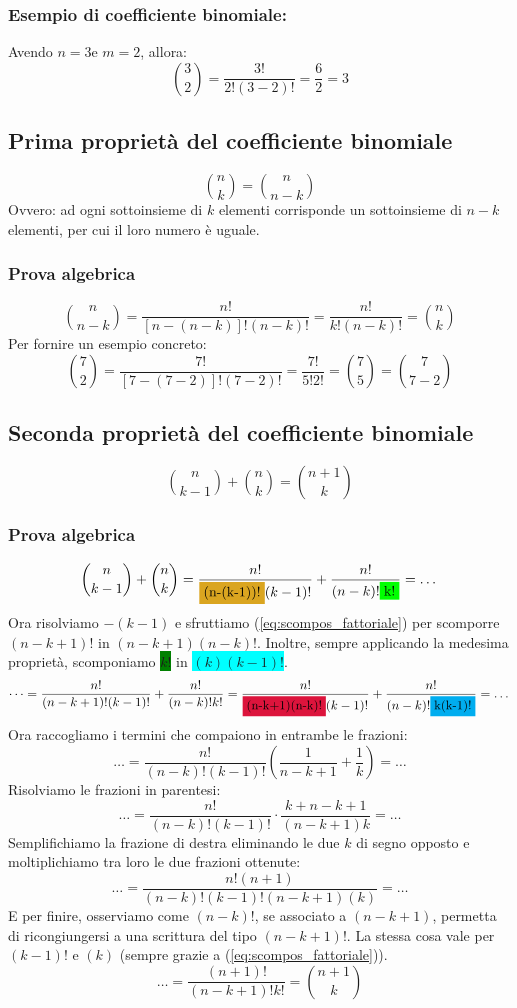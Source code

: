 \documentclass[12pt]{article}
\begin{document}
\subsubsection{Esempio di coefficiente binomiale:}
Avendo $n=3 \text{e } m=2$, allora:
\[
    \binom{3}{2} = \dfrac{3!}{2!(3-2)!} = \dfrac{6}{2} = 3
\]
\subsection{Prima proprietà del coefficiente binomiale}
\begin{equation}
    \binom{n}{k} = \binom{n}{n-k} \label{prop1_coeff_binomiale}
\end{equation}
Ovvero: ad ogni sottoinsieme di $k$ elementi corrisponde un sottoinsieme di $n-k$ elementi, per cui il loro numero è uguale.
\subsubsection{Prova algebrica}
\[
    \binom{n}{n-k} = \dfrac{n!}{[n-(n-k)]!(n-k)!} = \dfrac{n!}{k!(n-k)!} = \binom{n}{k}
\]
Per fornire un esempio concreto:
\[
    \binom{7}{2} = \dfrac{7!}{[7 - (7 - 2)]!(7-2)!} = \dfrac{7!}{5!2!} = \binom{7}{5} = \binom{7}{7-2}
\]
\subsection{Seconda proprietà del coefficiente binomiale}
\begin{equation}
    \binom{n}{k-1} + \binom{n}{k} = \binom{n+1}{k} \label{prop2_coeff_binomiale}
\end{equation}
\subsubsection{Prova algebrica}
\[
    \binom{n}{k-1} + \binom{n}{k} = \dfrac{n!}{\colorbox{goldenrod_yellow}{(n-(k-1))!}(k-1)!} + \dfrac{n!}{(n-k)!\colorbox{green}{k!}} = \dots
\]
Ora risolviamo \colorbox{goldenrod_yellow}{$-(k-1)$} e sfruttiamo (\ref{eq:scompos_fattoriale}) per scomporre \colorbox{goldenrod_yellow}{$(n-k+1)!$} in \colorbox{crimson_red}{$(n-k+1)(n-k)!$}. Inoltre, sempre applicando la medesima proprietà, scomponiamo \colorbox{green}{$k!$} in \colorbox{cyan}{$(k)(k-1)!$}.
\[
    \dots = \dfrac{n!}{(n-k+1)!(k-1)!} + \dfrac{n!}{(n-k)!k!} = \dfrac{n!}{\colorbox{crimson_red}{(n-k+1)(n-k)!}(k-1)!} + \dfrac{n!}{(n-k)!\colorbox{cyan}{k(k-1)!}} = \dots
\]
Ora raccogliamo i termini che compaiono in entrambe le frazioni:
\[
    \dots = \dfrac{n!}{(n-k)!(k-1)!}\left(\dfrac{1}{n-k+1} + \dfrac{1}{k}\right) = \dots
\]
Risolviamo le frazioni in parentesi:
\[
    \dots = \dfrac{n!}{(n-k)!(k-1)!} \cdot \dfrac{k + n -k + 1}{(n-k+1)k} = \dots
\]
Semplifichiamo la frazione di destra eliminando le due $k$ di segno opposto e moltiplichiamo tra loro le due frazioni ottenute:
\[
    \dots = \dfrac{n!(n+1)}{(n-k)!(k-1)!(n-k+1)(k)} = \dots
\]
E per finire, osserviamo come $(n-k)!$, se associato a $(n-k+1)$, permetta di ricongiungersi a una scrittura del tipo $(n-k+1)!$. La stessa cosa vale per $(k-1)!$ e $(k)$ (sempre grazie a (\ref{eq:scompos_fattoriale})).
\[
    \dots = \dfrac{(n+1)!}{(n-k+1)!k!} = \binom{n+1}{k}
\]
\pagebreak
\end{document}
